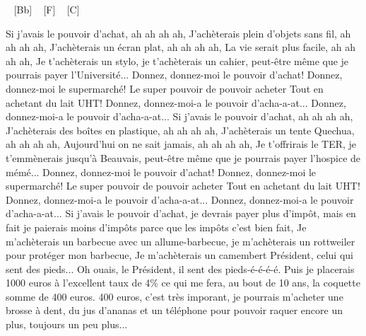 
\begin{guitar}
[D-] ~ [Bb] ~ [F] ~ [C]

Si j'avais le pouvoir d'achat, ah ah ah ah,
J'achèterais plein d'objets sans fil, ah ah ah ah,
J'achèterais un écran plat, ah ah ah ah,
La vie serait plus facile, ah ah ah ah,
Je t'achèterais un stylo, je t'achèterais un cahier, peut-être même que je pourrais payer l'Université...
Donnez, donnez-moi le pouvoir d'achat!
Donnez, donnez-moi le supermarché!
Le super pouvoir de pouvoir acheter
Tout en achetant du lait UHT!
Donnez, donnez-moi-a le pouvoir d'acha-a-at...
Donnez, donnez-moi-a le pouvoir d'acha-a-at...
Si j'avais le pouvoir d'achat, ah ah ah ah,
J'achèterais des boîtes en plastique, ah ah ah ah,
J'achèterais un tente Quechua, ah ah ah ah,
Aujourd'hui on ne sait jamais, ah ah ah ah,
Je t'offrirais le TER, je t'emmènerais jusqu'à Beauvais, peut-être même que je pourrais payer l'hospice de mémé...
Donnez, donnez-moi le pouvoir d'achat!
Donnez, donnez-moi le supermarché!
Le super pouvoir de pouvoir acheter
Tout en achetant du lait UHT!
Donnez, donnez-moi-a le pouvoir d'acha-a-at...
Donnez, donnez-moi-a le pouvoir d'acha-a-at...
Si j'avais le pouvoir d'achat, je devrais payer plus d'impôt, mais en fait je paierais moins d'impôts parce que les impôts c'est bien fait,
Je m'achèterais un barbecue avec un allume-barbecue, je m'achèterais un rottweiler pour protéger mon barbecue,
Je m'achèterais un camembert Président, celui qui sent des pieds... Oh ouais, le Président, il sent des pieds-é-é-é-é.
Puis je placerais 1000 euros à l'excellent taux de 4\% ce qui me fera, au bout de 10 ans, la coquette somme de 400 euros. 400 euros, c'est très imporant, je pourrais m'acheter une brosse à dent, du jus d'ananas et un téléphone pour pouvoir raquer encore un plus, toujours un peu plus...
\end{guitar}